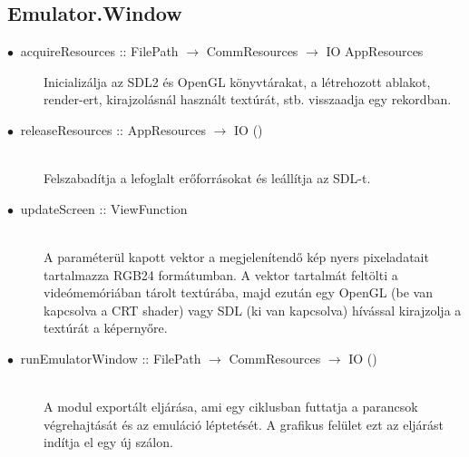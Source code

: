 \subsection{Emulator.Window}

\begin{description}
	\item[$\bullet\:$ acquireResources :: FilePath $\rightarrow$ CommResources $\rightarrow$ IO AppResources] \hfill Inicializálja az SDL2 és OpenGL könyvtárakat, a létrehozott ablakot, render-ert, kirajzolásnál használt textúrát, stb. visszaadja egy rekordban.
	\item[$\bullet\:$ releaseResources :: AppResources $\rightarrow$ IO ()] \hfill \\
	Felszabadítja a lefoglalt erőforrásokat és leállítja az SDL-t.
	\item[$\bullet\:$ updateScreen :: ViewFunction] \hfill \\
	A paraméterül kapott vektor a megjelenítendő kép nyers pixeladatait tartalmazza RGB24 formátumban. A vektor tartalmát feltölti a videómemóriában tárolt textúrába, majd ezután egy OpenGL (be van kapcsolva a CRT shader) vagy SDL (ki van kapcsolva) hívással kirajzolja a textúrát a képernyőre.
	\item[$\bullet\:$ runEmulatorWindow :: FilePath $\rightarrow$ CommResources $\rightarrow$ IO ()] \hfill \\
	A modul exportált eljárása, ami egy ciklusban futtatja a parancsok végrehajtását és az emuláció léptetését. A grafikus felület ezt az eljárást indítja el egy új szálon.
\end{description}

